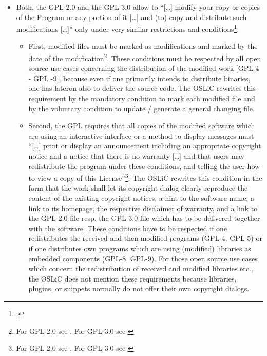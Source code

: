 \begin{itemize}
  \item Both, the GPL-2.0 and the GPL-3.0 allow to \enquote{[\ldots] modify your
  copy or copies of the Program or any portion of it [\ldots] and (to) copy and
  distribute such modifications [\ldots]} only under very similar restrictions
  and conditions\footcite[cf.][\nopage wp.\ §2]{Gpl20OsiLicense1991a}:
  \begin{itemize}
    \item First, modified files must be marked as modifications and marked by
    the date of the modification\footnote{For GPL-2.0 see \cite[cf.][\nopage wp.\
    §2]{Gpl20OsiLicense1991a}. For GPL-3.0 see \cite[cf.][\nopage wp.\
    §5]{Gpl30OsiLicense2007a}}. These conditions must be respected by all open
    source use cases concerning the distribution of the modified work [GPL-4 -
    GPL -9], because even if one primarily intends to distribute binaries, one
    has lateron also to deliver the source code. The OSLiC rewrites this
    requirement by the mandatory condition to mark each modified file and by the
    voluntary condition to update / generate a general changing file.
    
    \item Second, the GPL requires that all copies of the modified software
    which are using an interactive interface or a method to display messages
    must \enquote{[\ldots] print or display an announcement including an
    appropriate copyright notice and a notice that there is no warranty [\ldots]
    and that users may redistribute the program under these conditions, and
    telling the user how to view a copy of this License}\footnote{For GPL-2.0
    see \cite[cf.][\nopage wp.\ §2c]{Gpl20OsiLicense1991a}. For GPL-3.0 see
    \cite[cf.][\nopage wp.\ §5d]{Gpl30OsiLicense2007a}}. The OSLiC rewrites this
    condition in the form that the work shall let its copyright dialog clearly
    reproduce the content of the existing copyright notices, a hint to the
    software name, a link to its homepage, the respective disclaimer of
    warranty, and a link to the GPL-2.0-file resp. the GPL-3.0-file which has to
    be delivered together with the software. These conditions have to be
    respected if one redistributes the received and then modified programs
    (GPL-4, GPL-5) or if one distributes own programs which are using (modified)
    libraries as embedded components (GPL-8, GPL-9). For those open source use
    cases which concern the redistribution of  received and modified libraries
    etc., the OSLiC does not mention these requirements because libraries,
    plugins, or snippets normally do not offer their own copyright dialogs.
    

\end{itemize}
\end{itemize}
